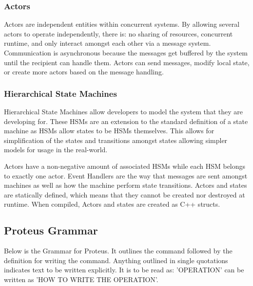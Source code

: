 \subsubsection{Actors}\label{subsubsec:Actors}

Actors are independent entities within concurrent systems.
By allowing several actors to operate independently, there is: no sharing of resources, concurrent runtime, and only interact amongst each other via a message system.
Communication is asynchronous because the messages get buffered by the system until the recipient can handle them.
Actors can send messages, modify local state, or create more actors based on the message handling.

\subsubsection{Hierarchical State Machines}\label{subsubsec:HSM}

Hierarchical State Machines allow developers to model the system that they are developing for.
These HSMs are an extension to the standard definition of a state machine as HSMs allow states to be HSMs themselves.
This allows for simplification of the states and transitions amongst states allowing simpler models for usage in the real-world.

Actors have a non-negative amount of associated HSMs while each HSM belongs to exactly one actor.
Event Handlers are the way that messages are sent amongst machines as well as how the machine perform state transitions.
Actors and states are statically defined, which means that they cannot be created nor destroyed at runtime.
When compiled, Actors and states are created as C++ structs.

\subsection{Proteus Grammar}\label{subsec:ProteusGrammar}

Below is the Grammar for Proteus.
It outlines the command followed by the definition for writing the command.
Anything outlined in single quotations indicates text to be written explicitly.
It is to be read as: 'OPERATION' can be written as 'HOW TO WRITE THE OPERATION'.

